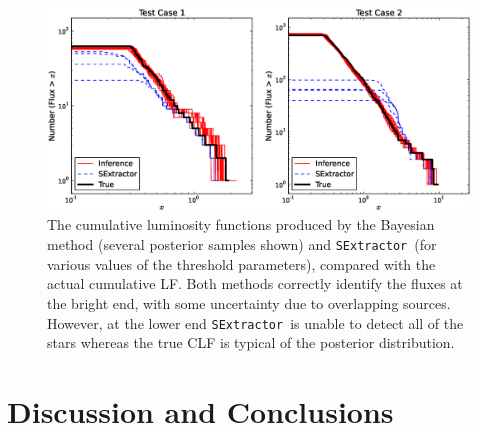 \documentclass[12pt, preprint]{aastex}
\newcommand{\sex}{{\tt SExtractor}}
\begin{document}
\begin{figure}[ht!]
\begin{center}
\includegraphics[width=\textwidth]{Figures/luminosity_function.eps}
\end{center}
\caption{The cumulative luminosity functions produced by the Bayesian method
(several posterior samples shown)
and
\sex~(for various values of the threshold parameters), compared with the
actual cumulative LF. Both methods correctly identify the fluxes at the bright
end, with some uncertainty due to overlapping sources. However, at the lower
end \sex~is unable to detect all of the stars whereas the true CLF is typical
of the posterior distribution.
\label{fig:luminosity_function}}
\end{figure}

\section{Discussion and Conclusions}\label{sec:conclusion}
\end{document}
